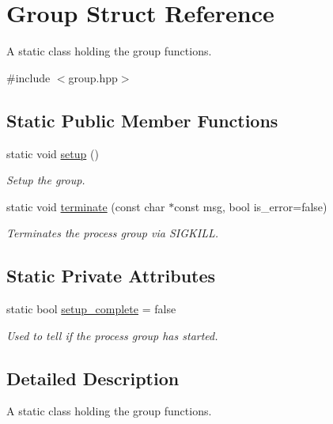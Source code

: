 \hypertarget{struct_group}{}\section{Group Struct Reference}
\label{struct_group}


A static class holding the group functions.  




{\ttfamily \#include $<$group.\+hpp$>$}

\subsection*{Static Public Member Functions}
\begin{DoxyCompactItemize}
\item 
static void \hyperlink{struct_group_a9e2d7e0c56696de4592f1b166188c10a}{setup} ()
\begin{DoxyCompactList}\small\item\em Setup the group. \end{DoxyCompactList}\item 
static void \hyperlink{struct_group_a8867a6d9f7987d3db83bf193bf42f858}{terminate} (const char $\ast$const msg, bool is\+\_\+error=false)
\begin{DoxyCompactList}\small\item\em Terminates the process group via S\+I\+G\+K\+I\+LL. \end{DoxyCompactList}\end{DoxyCompactItemize}
\subsection*{Static Private Attributes}
\begin{DoxyCompactItemize}
\item 
static bool \hyperlink{struct_group_a35632ca452cfe09fbf723539cd264f58}{setup\+\_\+complete} = false
\begin{DoxyCompactList}\small\item\em Used to tell if the process group has started. \end{DoxyCompactList}\end{DoxyCompactItemize}


\subsection{Detailed Description}
A static class holding the group functions. 

